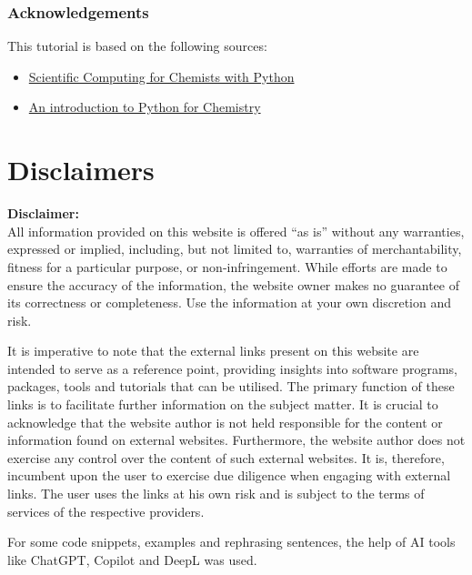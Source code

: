 \documentclass[
  letterpaper,
  DIV=11,
  numbers=noendperiod]{scrreprt}
\begin{document}
\subsection{Acknowledgements}\label{acknowledgements}

This tutorial is based on the following sources:

\begin{itemize}
\item
  \href{https://weisscharlesj.github.io/SciCompforChemists/notebooks/introduction/intro.html\#}{Scientific
  Computing for Chemists with Python}
\item
  \href{https://pythoninchemistry.org/intro_python_chemists/intro.html}{An
  introduction to Python for Chemistry}
\end{itemize}

\chapter{Disclaimers}\label{disclaimers}

\textbf{Disclaimer:}\\
All information provided on this website is offered ``as is'' without
any warranties, expressed or implied, including, but not limited to,
warranties of merchantability, fitness for a particular purpose, or
non-infringement. While efforts are made to ensure the accuracy of the
information, the website owner makes no guarantee of its correctness or
completeness. Use the information at your own discretion and risk.

\begin{tcolorbox}[enhanced jigsaw, leftrule=.75mm, bottomrule=.15mm, colbacktitle=quarto-callout-warning-color!10!white, title=\textcolor{quarto-callout-warning-color}{\faExclamationTriangle}\hspace{0.5em}{External Link Policy}, breakable, arc=.35mm, toptitle=1mm, opacityback=0, titlerule=0mm, coltitle=black, colback=white, opacitybacktitle=0.6, colframe=quarto-callout-warning-color-frame, left=2mm, rightrule=.15mm, toprule=.15mm, bottomtitle=1mm]

It is imperative to note that the external links present on this website
are intended to serve as a reference point, providing insights into
software programs, packages, tools and tutorials that can be utilised.
The primary function of these links is to facilitate further information
on the subject matter. It is crucial to acknowledge that the website
author is not held responsible for the content or information found on
external websites. Furthermore, the website author does not exercise any
control over the content of such external websites. It is, therefore,
incumbent upon the user to exercise due diligence when engaging with
external links. The user uses the links at his own risk and is subject
to the terms of services of the respective providers.

\end{tcolorbox}

For some code snippets, examples and rephrasing sentences, the help of
AI tools like ChatGPT, Copilot and DeepL was used.
\end{document}
